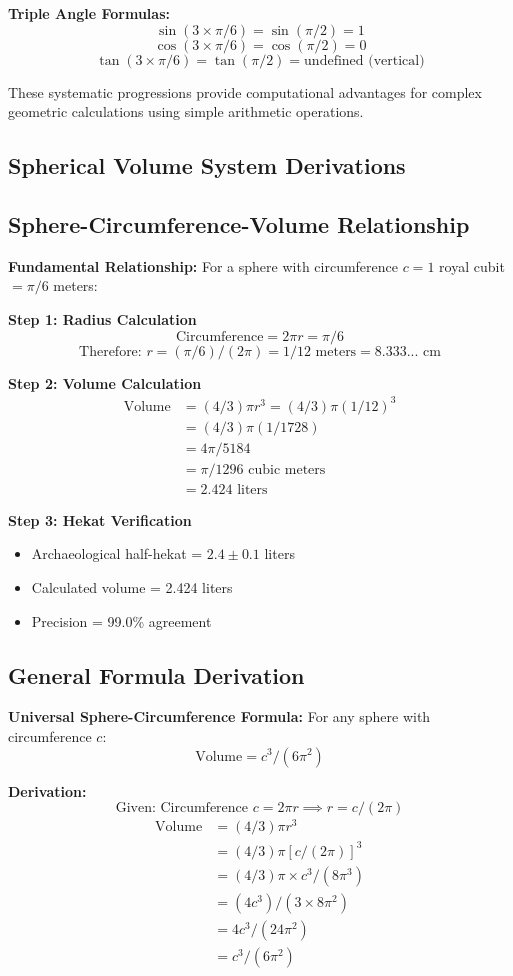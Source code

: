 \documentclass[11pt]{article}
\begin{document}
\textbf{Triple Angle Formulas:}
\[ \sin(3 \times \pi/6) = \sin(\pi/2) = 1 \]
\[ \cos(3 \times \pi/6) = \cos(\pi/2) = 0 \]
\[ \tan(3 \times \pi/6) = \tan(\pi/2) = \text{undefined (vertical)} \]

These systematic progressions provide computational advantages for complex geometric calculations using simple arithmetic operations.

\subsection{Spherical Volume System Derivations}

\subsection{Sphere-Circumference-Volume Relationship}
\textbf{Fundamental Relationship:} For a sphere with circumference $c = 1$ royal cubit $= \pi/6$ meters:

\textbf{Step 1: Radius Calculation}
\[ \text{Circumference} = 2\pi r = \pi/6 \]
\[ \text{Therefore: } r = (\pi/6)/(2\pi) = 1/12 \text{ meters} = 8.333... \text{ cm} \]

\textbf{Step 2: Volume Calculation}
\begin{align*}
\text{Volume} &= (4/3)\pi r^3 = (4/3)\pi(1/12)^3 \\
             &= (4/3)\pi(1/1728) \\
             &= 4\pi/5184 \\
             &= \pi/1296 \text{ cubic meters} \\
             &= 2.424 \text{ liters}
\end{align*}

\textbf{Step 3: Hekat Verification}
\begin{itemize}
    \item Archaeological half-hekat = $2.4 \pm 0.1$ liters
    \item Calculated volume = 2.424 liters
    \item Precision = 99.0\% agreement
\end{itemize}

\subsection{General Formula Derivation}
\textbf{Universal Sphere-Circumference Formula:} For any sphere with circumference $c$:
\[ \text{Volume} = c^3/(6\pi^2) \]

\textbf{Derivation:}
\[ \text{Given: Circumference } c = 2\pi r \implies r = c/(2\pi) \]
\begin{align*}
\text{Volume} &= (4/3)\pi r^3 \\
             &= (4/3)\pi[c/(2\pi)]^3 \\
             &= (4/3)\pi \times c^3/(8\pi^3) \\
             &= (4c^3)/(3 \times 8\pi^2) \\
             &= 4c^3/(24\pi^2) \\
             &= c^3/(6\pi^2)
\end{align*}
\end{document}
